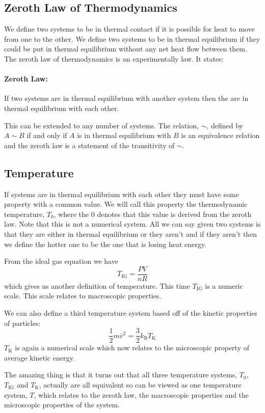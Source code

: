 \documentclass[a4paper]{article}
\newcommand{\boltzmann}{k_\mathrm{B}}
\begin{document}
    \subsection{Zeroth Law of Thermodynamics}
    We define two systems to be in thermal contact if it is possible for heat to move from one to the other.
    We define two systems to be in thermal equilibrium if they could be put in thermal equilibrium without any net heat flow between them.
    The zeroth law of thermodynamics is an experimentally law.
    It states:
    \paragraph{Zeroth Law:} If two systems are in thermal equilibrium with another system then the are in thermal equilibrium with each other.
    
    This can be extended to any number of systems.
    The relation, \(\sim\), defined by \(A\sim B\) if and only if \(A\) is in thermal equilibrium with \(B\) is an equivalence relation and the zeroth law is a statement of the transitivity of \(\sim\).
    
    \subsection{Temperature}
    If systems are in thermal equilibrium with each other they must have some property with a common value.
    We will call this property the thermodynamic temperature, \(T_0\), where the 0 denotes that this value is derived from the zeroth law.
    Note that this is not a numerical system.
    All we can say given two systems is that they are either in thermal equilibrium or they aren't and if they aren't then we define the hotter one to be the one that is losing heat energy.
    
    From the ideal gas equation we have
    \[T_\mathrm{IG} = \frac{PV}{nR}\]
    which gives us another definition of temperature.
    This time \(T_\mathrm{IG}\) is a numeric scale.
    This scale relates to macroscopic properties.
    
    We can also define a third temperature system based off of the kinetic properties of particles:
    \[\frac{1}{2}m\bar{v}^2 = \frac{3}{2}\boltzmann T_\mathrm{K}\]
    \(T_\mathrm{K}\) is again a numerical scale which now relates to the microscopic property of average kinetic energy.
    
    The amazing thing is that it turns out that all three temperature systems, \(T_0\), \(T_\mathrm{IG}\) and \(T_\mathrm{K}\), actually are all equivalent so can be viewed as one temperature system, \(T\), which relates to the zeroth law, the macroscopic properties and the microscopic properties of the system.
    
\end{document}
